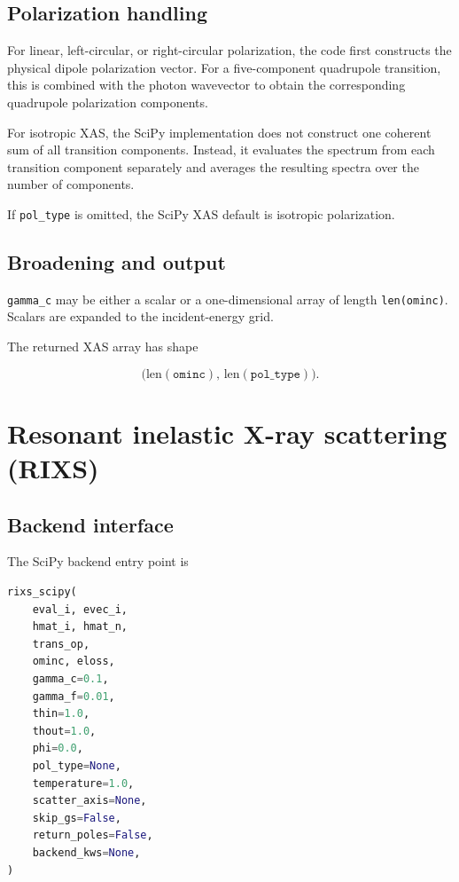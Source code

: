 \documentclass[11pt]{article}
\begin{document}
\subsection{Polarization handling}

For linear, left-circular, or right-circular polarization, the code first constructs the physical dipole polarization vector.  For a five-component quadrupole transition, this is combined with the photon wavevector to obtain the corresponding quadrupole polarization components.

For isotropic XAS, the SciPy implementation does not construct one coherent sum of all transition components.  Instead, it evaluates the spectrum from each transition component separately and averages the resulting spectra over the number of components.

If \texttt{pol\_type} is omitted, the SciPy XAS default is isotropic polarization.

\subsection{Broadening and output}

\texttt{gamma\_c} may be either a scalar or a one-dimensional array of length \texttt{len(ominc)}.  Scalars are expanded to the incident-energy grid.

The returned XAS array has shape

\begin{equation}
  \bigl(\mathrm{len}(\texttt{ominc}),\,
  \mathrm{len}(\texttt{pol\_type})\bigr).
\end{equation}

\section{Resonant inelastic X-ray scattering (RIXS)}

\subsection{Backend interface}

The SciPy backend entry point is

\begin{lstlisting}[language=Python]
rixs_scipy(
    eval_i, evec_i,
    hmat_i, hmat_n,
    trans_op,
    ominc, eloss,
    gamma_c=0.1,
    gamma_f=0.01,
    thin=1.0,
    thout=1.0,
    phi=0.0,
    pol_type=None,
    temperature=1.0,
    scatter_axis=None,
    skip_gs=False,
    return_poles=False,
    backend_kws=None,
)
\end{lstlisting}
\end{document}
